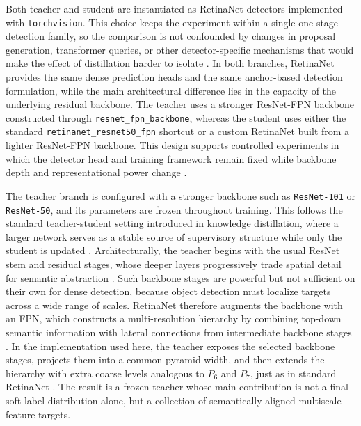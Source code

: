 Both teacher and student are instantiated as RetinaNet detectors implemented with \texttt{torchvision}. This choice keeps the experiment within a single one-stage detection family, so the comparison is not confounded by changes in proposal generation, transformer queries, or other detector-specific mechanisms that would make the effect of distillation harder to isolate \cite{lin2017focal}. In both branches, RetinaNet provides the same dense prediction heads and the same anchor-based detection formulation, while the main architectural difference lies in the capacity of the underlying residual backbone. The teacher uses a stronger ResNet-FPN backbone constructed through \texttt{resnet\_fpn\_backbone}, whereas the student uses either the standard \texttt{retinanet\_resnet50\_fpn} shortcut or a custom RetinaNet built from a lighter ResNet-FPN backbone. This design supports controlled experiments in which the detector head and training framework remain fixed while backbone depth and representational power change \cite{he2016resnet,lin2017fpn,lin2017focal}.


The teacher branch is configured with a stronger backbone such as \texttt{ResNet-101} or \texttt{ResNet-50}, and its parameters are frozen throughout training. This follows the standard teacher-student setting introduced in knowledge distillation, where a larger network serves as a stable source of supervisory structure while only the student is updated \cite{hinton2015distilling}. Architecturally, the teacher begins with the usual ResNet stem and residual stages, whose deeper layers progressively trade spatial detail for semantic abstraction \cite{he2016resnet}. Such backbone stages are powerful but not sufficient on their own for dense detection, because object detection must localize targets across a wide range of scales. RetinaNet therefore augments the backbone with an FPN, which constructs a multi-resolution hierarchy by combining top-down semantic information with lateral connections from intermediate backbone stages \cite{lin2017fpn}. In the implementation used here, the teacher exposes the selected backbone stages, projects them into a common pyramid width, and then extends the hierarchy with extra coarse levels analogous to $P_6$ and $P_7$, just as in standard RetinaNet \cite{lin2017focal}. The result is a frozen teacher whose main contribution is not a final soft label distribution alone, but a collection of semantically aligned multiscale feature targets.

